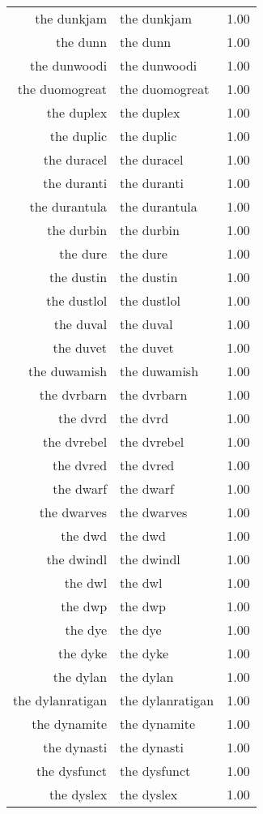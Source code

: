 \begin{table}[ht]
\begin{tabular}{rlr}
  the dunkjam & the dunkjam & 1.00 \\ 
  the dunn & the dunn & 1.00 \\ 
  the dunwoodi & the dunwoodi & 1.00 \\ 
  the duomogreat & the duomogreat & 1.00 \\ 
  the duplex & the duplex & 1.00 \\ 
  the duplic & the duplic & 1.00 \\ 
  the duracel & the duracel & 1.00 \\ 
  the duranti & the duranti & 1.00 \\ 
  the durantula & the durantula & 1.00 \\ 
  the durbin & the durbin & 1.00 \\ 
  the dure & the dure & 1.00 \\ 
  the dustin & the dustin & 1.00 \\ 
  the dustlol & the dustlol & 1.00 \\ 
  the duval & the duval & 1.00 \\ 
  the duvet & the duvet & 1.00 \\ 
  the duwamish & the duwamish & 1.00 \\ 
  the dvrbarn & the dvrbarn & 1.00 \\ 
  the dvrd & the dvrd & 1.00 \\ 
  the dvrebel & the dvrebel & 1.00 \\ 
  the dvred & the dvred & 1.00 \\ 
  the dwarf & the dwarf & 1.00 \\ 
  the dwarves & the dwarves & 1.00 \\ 
  the dwd & the dwd & 1.00 \\ 
  the dwindl & the dwindl & 1.00 \\ 
  the dwl & the dwl & 1.00 \\ 
  the dwp & the dwp & 1.00 \\ 
  the dye & the dye & 1.00 \\ 
  the dyke & the dyke & 1.00 \\ 
  the dylan & the dylan & 1.00 \\ 
  the dylanratigan & the dylanratigan & 1.00 \\ 
  the dynamite & the dynamite & 1.00 \\ 
  the dynasti & the dynasti & 1.00 \\ 
  the dysfunct & the dysfunct & 1.00 \\ 
  the dyslex & the dyslex & 1.00 \\ 

\end{tabular}
\end{table}
